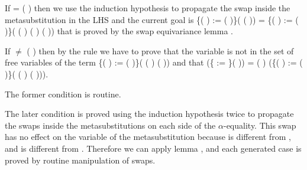 \begin{coqdoccode}
\end{coqdoccode}
If  = (   ) then we use the induction hypothesis to propagate the swap inside the metasubstitution in the LHS and the current goal is \{(   ) := (   )\}(   (   )) =
  \{(   ) := (   )\}( (   ) (   ) (   )) that is proved by the swap equivariance lemma .
\begin{coqdoccode}
\end{coqdoccode}
If  \ensuremath{\not=} (   ) then by the rule  we have to prove that the variable     is not in the set of free variables of the term \{(   ) := (   )\}( (   )  (   )) and that    (\{ := \}(   )) =
    (   ) (\{(   ) := (   )\}( (   )  (   ))).
\begin{coqdoccode}
\end{coqdoccode}
The former condition is routine.
\begin{coqdoccode}
\end{coqdoccode}
The later condition is proved using the induction hypothesis twice to propagate the swaps inside the metasubstitutions on each side of the $\alpha$-equality. This swap has no effect on the variable  of the metasubstitution because  is different from    , and  is different from . Therefore we can apply lemma , and each generated case is proved by routine manipulation of swaps.
